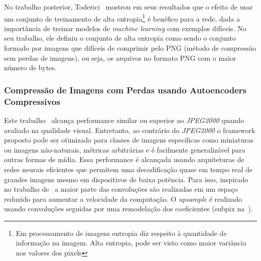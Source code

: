 
No trabalho posterior, Toderici~\cite{toderici2017full} mostrou em seus resultados que o efeito de usar um conjunto de treinamento de alta entropia\footnote{Em processamento de imagens entropia diz respeito à quantidade de informação na imagem. Alta entropia, pode ser visto como maior variância nos valores dos pixels} é benéfico para a rede, dada a importância de treinar modelos de \textit{machine learning} com exemplos difíceis. No seu trabalho, ele definiu o conjunto de alta entropia como sendo o conjunto formado por imagens que difíceis de comprimir pelo \acrshort{PNG} (método de compressão sem perdas de imagens), ou seja, os arquivos no formato \acrshort{PNG} com o maior número de bytes. 
\subsubsection{Compressão de Imagens com Perdas usando Autoencoders Compressivos}
Este trabalho~\cite{theis2017lossy} alcança performance similar ou superior ao \textit{JPEG2000} quando avaliado na qualidade visual. Entretanto, ao contrário do \textit{JPEG2000} o framework proposto pode ser otimizado para classes de imagens específicas como miniaturas ou imagens não-naturais, métricas arbitrárias e é facilmente generalizável para outras formas de mídia. Essa performance é alcançada usando arquiteturas de redes neurais eficientes que permitem uma decodificação quase em tempo real de grandes imagens mesmo em dispositivos de baixa potência. Para isso, inspirado no trabalho de~\cite{shi2016real} a maior parte das convoluções são realizadas em um espaço reduzido para aumentar a velocidade da computação. O \textit{upsample} é realizado usando convoluções seguidas por uma remodelação dos coeficientes (subpix na~).

